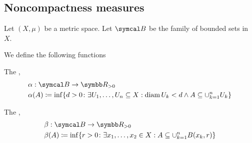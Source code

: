 \subsection{Noncompactness measures}\label{subsec:noncompactness_measures}

Let \( (X, \mu) \) be a metric space. Let \( \Cal{B} \) be the family of bounded sets in \( X \).

\begin{definition}\label{def:noncompactness_measures}\cite[definition 7.1]{Deimling1985}
  We define the following functions
  \begin{defenum}
     The ,
    \begin{align*}
      &\alpha: \Cal{B} \to \R_{>0} \\
      &\alpha(A) \coloneqq \inf \{d > 0 \colon \exists U_1, \ldots, U_n \subseteq X: \Diam {U_k} < d \land A \subseteq \cup_{k=1}^n U_k \}
    \end{align*}

     The ,
    \begin{align*}
      &\beta: \Cal{B} \to \R_{>0} \\
      &\beta(A) \coloneqq \inf \{r > 0 \colon \exists x_1, \ldots, x_2 \in X: A \subseteq \cup_{k=1}^n B(x_k, r) \}
    \end{align*}
  \end{defenum}
\end{definition}

